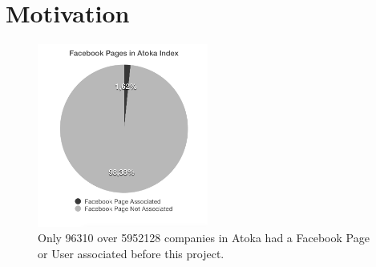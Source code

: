 \chapter{Motivation} 

\begin{figure}
\centering
\includegraphics[width=0.5\textwidth]{img/facebook_atoka_bw.png}
\caption{Only 96310 over 5952128 companies in Atoka had a Facebook Page or User associated before this project.}
\label{Fig.1}
\end{figure}


